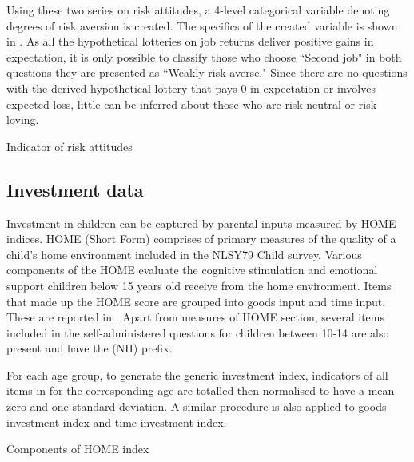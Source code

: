 \documentclass[]{article}
\begin{document}
Using these two series on risk attitudes, a 4-level categorical variable denoting degrees of risk aversion is created. The specifics of the created variable is shown in . As all the hypothetical lotteries on job returns deliver positive gains in expectation, it is only possible to classify those who choose ``Second job" in both questions they are presented as ``Weakly risk averse." Since there are no questions with the derived hypothetical lottery that pays 0 in expectation or involves expected loss, little can be inferred about those who are risk neutral or risk loving.  

\begin{table}[!h]
	\centering
	\setlength{\extrarowheight}{0.2em}
	\caption{Indicator of risk attitudes}	
	
	\label{table:1}
\end{table}



\subsection{Investment data}
Investment in children can be captured by parental inputs measured by HOME indices. HOME (Short Form) comprises of primary measures of the quality of a child's home environment included in the NLSY79 Child survey. Various components of the HOME evaluate the cognitive stimulation and emotional support children below 15 years old receive from the home environment. Items that made up the HOME score are grouped into goods input and time input. These are reported in . Apart from measures of HOME section, several items included in the self-administered questions for children between 10-14 are also present and have the (NH) prefix.  

For each age group, to generate the generic investment index, indicators of all items in  for the corresponding age are totalled then normalised to have a mean zero and one standard deviation. A similar procedure is also applied to goods investment index and time investment index.

\begin{table}
	\centering
	\setlength{\extrarowheight}{0.2em}
	\caption{Components of HOME index}	
	
	\label{table:2}
\end{table}  


\begin{table}
	
\end{table}

\pagebreak

%
%
\end{document}
